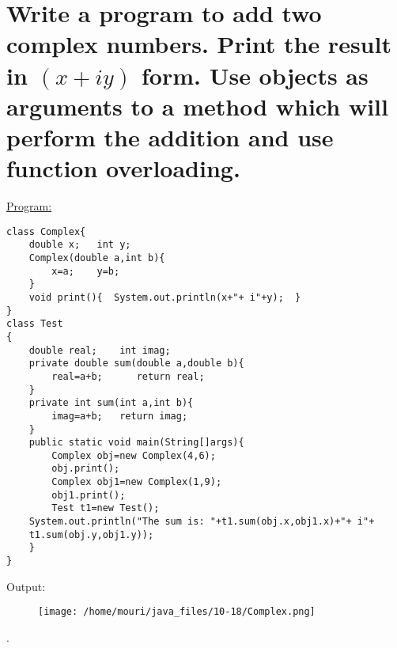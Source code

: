 \documentclass[a4paper,11pt]{article}
\begin{document}
\section{Write a program to add two complex numbers. Print the result in $(x+iy)$ form. Use objects as arguments to a method which will perform the addition and use function overloading.}
\underline{Program:}
\begin{lstlisting}[showstringspaces=false]
class Complex{
    double x;   int y;
    Complex(double a,int b){
    	x=a;	y=b;
    }
    void print(){  System.out.println(x+"+ i"+y);  }	
}
class Test
{
    double real;    int imag;
    private double sum(double a,double b){
        real=a+b;	   return real;
    }
    private int sum(int a,int b){
    	imag=a+b;   return imag;
    }
    public static void main(String[]args){
    	Complex obj=new Complex(4,6);
    	obj.print();
    	Complex obj1=new Complex(1,9);
    	obj1.print();
    	Test t1=new Test();
	System.out.println("The sum is: "+t1.sum(obj.x,obj1.x)+"+ i"+
	t1.sum(obj.y,obj1.y));
    }
}
\end{lstlisting}
Output:
\begin{figure}[H]
\centering
\texttt{[image: /home/mouri/java\_files/10-18/Complex.png]}
\end{figure}
.
\end{document}
